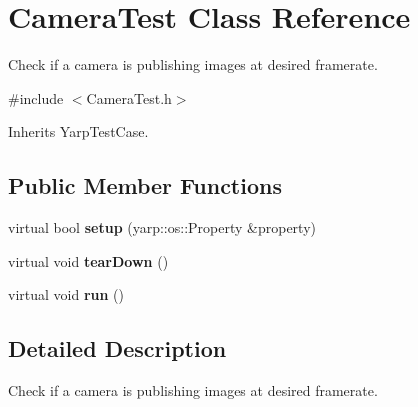 \section{Camera\+Test Class Reference}
\label{classCameraTest}


Check if a camera is publishing images at desired framerate.  




{\ttfamily \#include $<$Camera\+Test.\+h$>$}



Inherits Yarp\+Test\+Case.

\subsection*{Public Member Functions}
\begin{DoxyCompactItemize}
\item 
\label{classCameraTest_ac059968960ce6deaee9c60623ba2266d} 
virtual bool {\bfseries setup} (yarp\+::os\+::\+Property \&property)
\item 
\label{classCameraTest_a9d99fe4d4b8929fbfaf280ed87388dc2} 
virtual void {\bfseries tear\+Down} ()
\item 
\label{classCameraTest_a1c55590d1e9b43051fa8a818559abff2} 
virtual void {\bfseries run} ()
\end{DoxyCompactItemize}


\subsection{Detailed Description}
Check if a camera is publishing images at desired framerate. 


